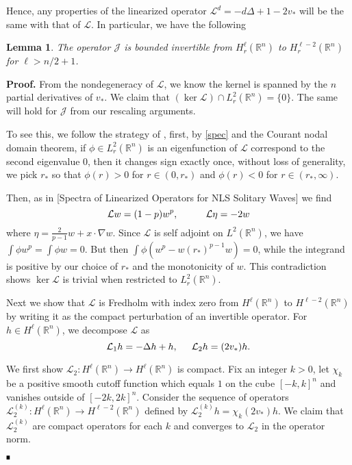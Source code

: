 \documentclass[letterpaper,11pt]{article}
\newcommand{\R}{\mathbb{R}}
\newcommand{\cL}{\mathcal{L}}
\newcommand{\cJ}{\mathcal{J}}
\numberwithin{equation}{section}
\theoremstyle{plain}
\newtheorem{lemma}[theorem]{Lemma}
\theoremstyle{remark}
\newenvironment{Proof}[1][.]%
 {\begin{trivlist}\item[]\textbf{Proof#1 }}%
 {\hspace*{\fill}$\rule{0.3\baselineskip}{0.35\baselineskip}$\end{trivlist}}
\begin{document}
Hence, any properties of the linearized operator $\cL^d = -d\Delta +1 -2v_*$ will be the same with that of $\cL$. In particular, we have the following 




\begin{lemma}\label{Nondegen}
The operator $\cJ$ is bounded invertible from  $H^{\ell}_r(\R^n)$ to $H^{\ell-2}_r(\R^n)$ for $\ell>n/2+1$.
\end{lemma}
\begin{Proof}
From the nondegeneracy of $\cL$, we know the kernel is spanned by the $n$ partial derivatives of $v_*$. We claim that $(\ker \cL )\cap L^2_r(\R^n) = \{0\}$. The same will hold for $\cJ$ from our rescaling arguments.

To see this, we follow the strategy of \cite{chang2007spectra}, first, by \ref{spec} and the Courant nodal domain theorem, if $\phi \in L^2_r(\R^n)$ is an eigenfunction of $\cL$ correspond to the second eigenvalue $0$, then it changes sign exactly once, without loss of generality, we pick $r_*$ so that $\phi(r)>0$ for $r\in (0,r_*)$ and $\phi(r)<0$ for $r \in (r_*,\infty)$.

Then, as in [Spectra of Linearized Operators for NLS Solitary Waves] we find 
\[
\cL w = (1-p)w^p, \hspace{0.4in} \cL \eta = -2 w
\]
where $\eta = \frac{2}{p-1}w+x\cdot \nabla w$. Since $\cL$ is self adjoint on $L^2(\R^n)$, we have $\int \phi w^p=\int \phi w =0$. But then $\int \phi(w^p-w(r_*)^{p-1}w )=0$, while the integrand is positive by our choice of $r_*$ and the monotonicity of $w$. This contradiction shows $\ker \cL$ is trivial when restricted to $L_r^2(\R^n)$.

Next we show that $\cL$ is Fredholm with index zero from $H^\ell(\R^n)$ to $H^{\ell-2}(\R^n)$ by writing it as the compact perturbation of an invertible operator. For $h \in H^\ell(\R^n)$, we decompose $\mathcal{L}$ as
\[
\cL_1h = -\Delta h + h, \hspace{0.2in} \cL_2 h = (2v_*)h.
\] 

We first show $\cL_2: H^\ell(\R^n) \to H^\ell(\R^n)$ is compact. Fix an integer $k>0$, let $\chi_k$ be a positive smooth cutoff function which equals $1$ on the cube $[-k,k]^n$ and vanishes outside of $[-2k,2k]^n$. Consider the sequence of operators $\cL_2^{(k)} : H^\ell(\R^n) \to H^{\ell-2}(\R^n)$ defined by $\cL_2^{(k)} h = \chi_k (2v_*)h$. We claim that $\cL_2^{(k)}$ are compact operators for each $k$ and converges to $\cL_2$ in the operator norm.


\end{Proof}
\end{document}
